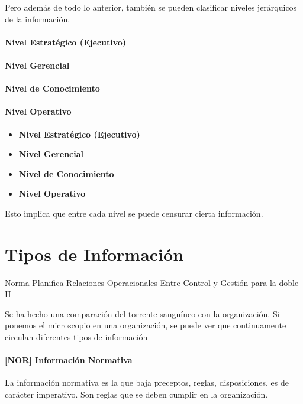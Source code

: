 Pero además de todo lo anterior, también se pueden clasificar niveles
jerárquicos de la información.

\paragraph{Nivel Estratégico (Ejecutivo)}
\paragraph{Nivel Gerencial}
\paragraph{Nivel de Conocimiento}
\paragraph{Nivel Operativo}

\begin{itemize}
  \setlength\itemsep{-1em}
\item  \textbf{Nivel Estratégico (Ejecutivo)}
\item  \textbf{Nivel Gerencial}
\item  \textbf{Nivel de Conocimiento}
\item  \textbf{Nivel Operativo}
\end{itemize}

Esto implica que entre cada nivel se puede censurar cierta información.

\hypertarget{tipos-de-informaciuxf3n}{%
\section{Tipos de Información }\label{tipos-de-informaciuxf3n}}

{\tiny
Norma Planifica Relaciones Operacionales Entre Control y Gestión para la doble II
}


Se ha hecho una comparación del torrente sanguíneo con la organización.
Si ponemos el microscopio en una organización, se puede ver que
continuamente circulan diferentes tipos de información

\hypertarget{informaciuxf3n-normativa}{%
\paragraph{[NOR] Información Normativa}\label{informaciuxf3n-normativa}}
La información normativa es la que baja preceptos, reglas,
disposiciones, es de carácter imperativo. Son reglas que se deben
cumplir en la organización.

